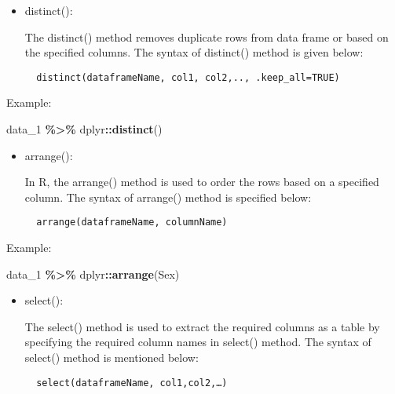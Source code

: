 \documentclass[
]{book}
\newenvironment{Shaded}{\begin{snugshade}}{\end{snugshade}}
\newcommand{\FunctionTok}[1]{\textcolor[rgb]{0.13,0.29,0.53}{\textbf{#1}}}
\newcommand{\NormalTok}[1]{#1}
\newcommand{\SpecialCharTok}[1]{\textcolor[rgb]{0.81,0.36,0.00}{\textbf{#1}}}
\begin{document}
\begin{itemize}
\item
  distinct():

  The distinct() method removes duplicate rows from data frame or based on the specified columns. The syntax of distinct() method is given below:

\begin{verbatim}
  distinct(dataframeName, col1, col2,.., .keep_all=TRUE)
\end{verbatim}
\end{itemize}

Example:

\begin{Shaded}
\begin{Highlighting}[]
\NormalTok{data\_1 }\SpecialCharTok{\%\textgreater{}\%} 
\NormalTok{  dplyr}\SpecialCharTok{::}\FunctionTok{distinct}\NormalTok{()}
\end{Highlighting}
\end{Shaded}

\begin{itemize}
\item
  arrange():

  In R, the arrange() method is used to order the rows based on a specified column. The syntax of arrange() method is specified below:

\begin{verbatim}
  arrange(dataframeName, columnName)
\end{verbatim}
\end{itemize}

Example:

\begin{Shaded}
\begin{Highlighting}[]
\NormalTok{data\_1 }\SpecialCharTok{\%\textgreater{}\%} 
\NormalTok{  dplyr}\SpecialCharTok{::}\FunctionTok{arrange}\NormalTok{(Sex)}
\end{Highlighting}
\end{Shaded}

\begin{itemize}
\item
  select():

  The select() method is used to extract the required columns as a table by specifying the required column names in select() method. The syntax of select() method is mentioned below:

\begin{verbatim}
  select(dataframeName, col1,col2,…)
\end{verbatim}
\end{itemize}
\end{document}
